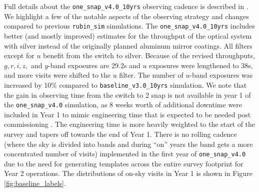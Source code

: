 \documentclass[preprintm,linenumbers]{aastex631}
\newcommand{\baseline}{\texttt{one\_snap\_v4.0}\xspace}
\newcommand{\baselinefull}{\texttt{one\_snap\_v4.0\_10yrs}\xspace}
\newcommand{\rubinsim}{\texttt{rubin\_sim}\xspace}
\begin{document}
   
    Full details about the \baselinefull observing cadence is described in \cite{SCOC_Report_3}. We highlight a few of the notable aspects of the observing strategy and changes compared to previous \rubinsim simulations. The \baselinefull includes better (and mostly improved) estimates for the throughput of the optical system with silver instead of the originally planned aluminum mirror coatings. All filters except for $u$ benefit from the switch to silver. Because of the revised throughputs, $g,r,i,z,$ and $y$-band exposures are 29.2s and $u$ exposures were lengthened to 38s, and more visits were shifted to the $u$ filter. The number of $u$-band exposures was increased by 10$\%$ compared to \texttt{baseline\_v3.0\_10yrs} simulation. We note that the gain in observing time from the switch to 2 snap is not available in year 1 of the \baseline simulation, as 8 weeks worth of additional downtime were included in Year 1  to mimic engineering time that is expected to be needed post commissioning \citep{SCOC_Report_3}. The engineering time is more heavily weighted to the start of the survey and tapers off towards the end of Year 1. There is no rolling cadence (where the sky is divided into bands and during ``on'' years the band gets a more concentrated number of visits) implemented in the first year of \baseline due to the need for generating templates across the entire survey footprint for Year 2 operations. The distributions of on-sky visits in Year 1 is shown in Figure \ref{fig:baseline_labels}.   
	
\end{document}
